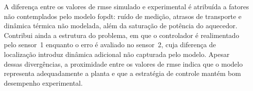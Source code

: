 A diferença entre os valores de \gls{rmse} simulado e experimental é atribuída a
fatores não contemplados pelo modelo \gls{fopdt}: ruído de medição, atrasos de
transporte e dinâmica térmica não modelada, além da saturação de potência do
aquecedor. Contribui ainda a estrutura do problema, em que o controlador é
realimentado pelo sensor~1 enquanto o erro é avaliado no sensor~2, cuja
diferença de localização introduz dinâmica adicional não capturada pelo modelo.
Apesar dessas divergências, a proximidade entre os valores de \gls{rmse} indica
que o modelo representa adequadamente a planta e que a estratégia de controle
mantém bom desempenho experimental.